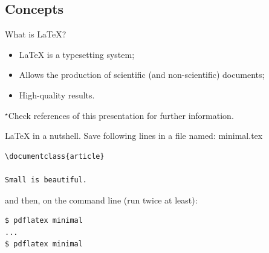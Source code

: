 \subsection{Concepts}
\begin{frame}{What is \LaTeX{}?}
\begin{itemize}
\item \LaTeX{} is a typesetting system;
\item Allows the production of scientific (and non-scientific) documents;
\item High-quality results.
\end{itemize}
\small $\phantom{}^\star$Check references of this presentation for further information.
\end{frame}

\begin{frame}[fragile]{\LaTeX{} in a nutshell.}
Save following lines in a file named: minimal.tex
\begin{verbatim}
\documentclass{article}

Small is beautiful.

\end{verbatim}
and then, on the command line (run twice at least):
\begin{verbatim}
$ pdflatex minimal
...
$ pdflatex minimal
\end{verbatim}
\end{frame}

